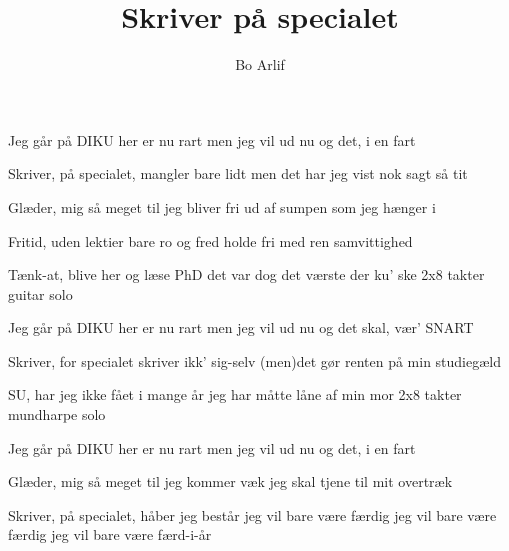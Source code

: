 \documentclass[10pt]{article}
\title{Skriver på specialet}
\author{Bo Arlif}
\begin{document}
\maketitle


\begin{song}
 Jeg går på DIKU
 her er nu rart
 men jeg vil ud nu
 og det, i en fart

 Skriver, på specialet, mangler bare lidt
 men det har jeg vist nok sagt så tit

 Glæder, mig så meget til jeg bliver fri
 ud af sumpen som jeg hænger i

 Fritid, uden lektier bare ro og fred
 holde fri med ren samvittighed

 Tænk-at, blive her og læse PhD
 det var dog det værste der ku' ske
\scene 2x8 takter guitar solo

 Jeg går på DIKU
 her er nu rart
 men jeg vil ud nu
 og det skal, vær' SNART

  Skriver, for specialet skriver ikk' sig-selv
 (men)det gør renten på min studiegæld

 SU, har jeg ikke fået i mange år
 jeg har måtte låne af min mor
\scene 2x8 takter mundharpe solo

 Jeg går på DIKU
 her er nu rart
 men jeg vil ud nu
 og det, i en fart

 Glæder, mig så meget til jeg kommer væk
 jeg skal tjene til mit overtræk

 Skriver, på specialet, håber jeg består
 jeg vil bare være færdig
 jeg vil bare være færdig
 jeg vil bare være færd-i-år

\end{song}
\end{document}
